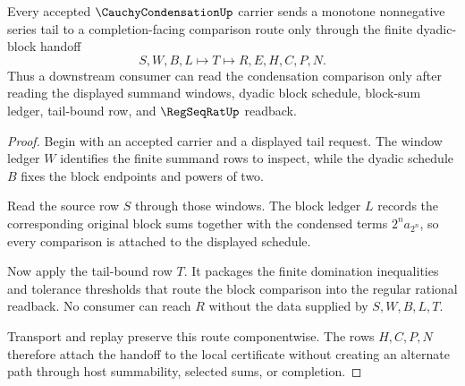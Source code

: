 \begin{theorem}
\label{thm:cauchy-condensation-dyadic-block-handoff}
Every accepted $\CauchyCondensationUp$ carrier sends a monotone nonnegative series tail to a completion-facing comparison route only through the finite dyadic-block handoff
$$
S,W,B,L \longmapsto T \longmapsto R,E,H,C,P,N.
$$
Thus a downstream consumer can read the condensation comparison only after reading the displayed summand windows, dyadic block schedule, block-sum ledger, tail-bound row, and $\RegSeqRatUp$ readback.
\end{theorem}
\begin{proof}
Begin with an accepted carrier and a displayed tail request. The window ledger $W$ identifies the finite summand rows to inspect, while the dyadic schedule $B$ fixes the block endpoints and powers of two.

Read the source row $S$ through those windows. The block ledger $L$ records the corresponding original block sums together with the condensed terms $2^n a_{2^n}$, so every comparison is attached to the displayed schedule.

Now apply the tail-bound row $T$. It packages the finite domination inequalities and tolerance thresholds that route the block comparison into the regular rational readback. No consumer can reach $R$ without the data supplied by $S,W,B,L,T$.

Transport and replay preserve this route componentwise. The rows $H,C,P,N$ therefore attach the handoff to the local certificate without creating an alternate path through host summability, selected sums, or completion.
\end{proof}

